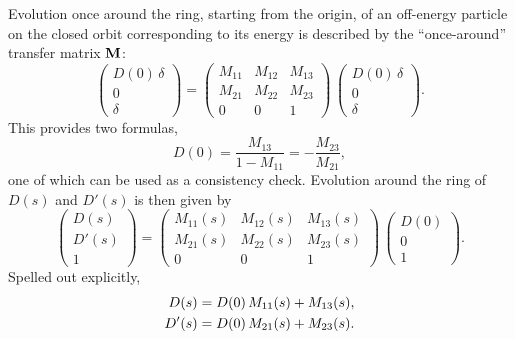 \documentclass[]{article}
\begin{document}
Evolution once around
the ring, starting from the origin, of an 
off-energy particle on the closed orbit corresponding to 
its energy is described by the ``once-around'' transfer
matrix ${\bf M}$:
%
\begin{equation}
\begin{pmatrix}
D(0)\,\delta \\ 0 \\ \delta
\end{pmatrix}
  =
\begin{pmatrix}
  M_{11}  &  M_{12}  &   M_{13} \\
  M_{21}  &  M_{22}  &   M_{23} \\
   0      &    0     &    1       
\end{pmatrix}\,
\begin{pmatrix}
D(0)\,\delta \\ 0 \\ \delta
\end{pmatrix}.
\label{eq:Dispersion.2} 
\end{equation}
%
This provides two formulas,
%
\begin{equation}
D(0) 
 =
\frac{M_{13}}{1-M_{11}}
 =
-\frac{M_{23}}{M_{21}},
\label{eq:Dispersion.3} 
\end{equation}
%
one of which can be used as a consistency check.
Evolution around the ring of $D(s)$ and $D'(s)$ is then
given by  
%
\begin{equation}
\begin{pmatrix}
D(s) \\ D'(s) \\ 1
\end{pmatrix}
  =
\begin{pmatrix}
  M_{11}(s)  &  M_{12}(s)  &   M_{13}(s) \\
  M_{21}(s)  &  M_{22}(s)  &   M_{23}(s) \\
   0      &    0     &    1       
\end{pmatrix}\,
\begin{pmatrix}
D(0) \\ 0 \\ 1
\end{pmatrix}.
\label{eq:Dispersion.4} 
\end{equation}
%
Spelled out explicitly,
%
\begin{align}
D(s)
 &=
D(0)\,M_{11}(s)
+M_{13}(s),       \notag \\
D'(s)
 &=
D(0)\,M_{21}(s)
+M_{23}(s).
\label{eq:Dispersion.5} 
\end{align}
%
\clearpage
\end{document}
